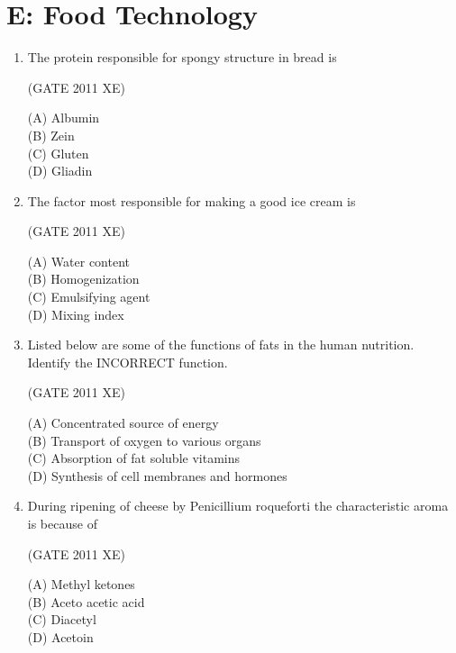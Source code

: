 \documentclass[journal,12pt,onecolumn]{IEEEtran}
\begin{document}
\section*{E: Food Technology}
\bigskip
\begin{enumerate}

\item The protein responsible for spongy structure in bread is

\hfill{(GATE 2011 XE)} \\
\begin{multicols}{4}
(A) Albumin \\
(B) Zein \\
(C) Gluten \\
(D) Gliadin
\end{multicols}


\item The factor most responsible for making a good ice cream is

\hfill{(GATE 2011 XE)} \\
\begin{multicols}{4}
(A) Water content \\
(B) Homogenization \\
(C) Emulsifying agent \\
(D) Mixing index
\end{multicols}

\item Listed below are some of the functions of fats in the human nutrition. Identify the INCORRECT function.

\hfill{(GATE 2011 XE)} \\
\begin{multicols}{2}
(A) Concentrated source of energy \\
(B) Transport of oxygen to various organs \\
(C) Absorption of fat soluble vitamins \\
(D) Synthesis of cell membranes and hormones
\end{multicols}

\item During ripening of cheese by Penicillium roqueforti the characteristic aroma is because of

\hfill{(GATE 2011 XE)} \\
\begin{multicols}{4}
(A) Methyl ketones \\
(B) Aceto acetic acid \\
(C) Diacetyl \\
(D) Acetoin
\end{multicols}


\end{enumerate}
\end{document}
